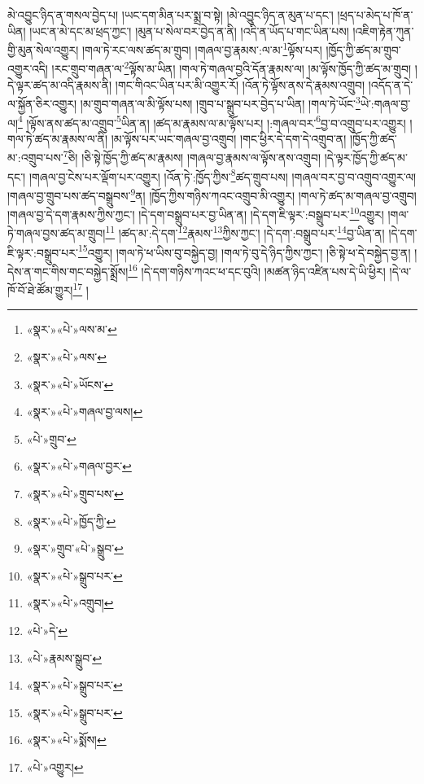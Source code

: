 མེ་འབྱུང་ཉིད་ན་གསལ་བྱེད་པ། །ཡང་དག་མིན་པར་སྨྲ་བ་སྟེ། །མེ་འབྱུང་ཉིད་ན་མུན་པ་དང་། །ཕྲད་པ་མེད་པ་ཁོ་ན་ཡིན། །ཡང་ན་མེ་དང་མ་ཕྲད་ཀྱང་། །མུན་པ་སེལ་བར་བྱེད་ན་ནི། །འདི་ན་ཡོད་པ་གང་ཡིན་པས། །འཇིག་རྟེན་ཀུན་གྱི་མུན་སེལ་འགྱུར། །གལ་ཏེ་རང་ལས་ཚད་མ་གྲུབ། །གཞལ་བྱ་རྣམས་:ལ་མ་\footnote{«སྣར་»«པེ་»ལས་མ་}ལྟོས་པར། །ཁྱོད་ཀྱི་ཚད་མ་གྲུབ་འགྱུར་འདི། །རང་གྲུབ་གཞན་ལ་\footnote{«སྣར་»«པེ་»ལས་}ལྟོས་མ་ཡིན། །གལ་ཏེ་གཞལ་བྱའི་དོན་རྣམས་ལ། །མ་ལྟོས་ཁྱོད་ཀྱི་ཚད་མ་གྲུབ། །དེ་ལྟར་ཚད་མ་འདི་རྣམས་ནི། །གང་གིའང་ཡིན་པར་མི་འགྱུར་རོ། །འོན་ཏེ་ལྟོས་ནས་དེ་རྣམས་འགྲུབ། །འདོད་ན་དེ་ལ་སྐྱོན་ཅིར་འགྱུར། །མ་གྲུབ་གཞན་ལ་མི་ལྟོས་པས། །གྲུབ་པ་སྒྲུབ་པར་བྱེད་པ་ཡིན། །གལ་ཏེ་ཡོང་\footnote{«སྣར་»«པེ་»ཡོངས་}ཡེ་:གཞལ་བྱ་ལ།\footnote{«སྣར་»«པེ་»གཞལ་བྱ་ལས།} །ལྟོས་ནས་ཚད་མ་འགྲུབ་\footnote{«པེ་»གྲུབ་}ཡིན་ན། །ཚད་མ་རྣམས་ལ་མ་ལྟོས་པར། །:གཞལ་བར་\footnote{«སྣར་»«པེ་»གཞལ་བྱར་}བྱ་བ་འགྲུབ་པར་འགྱུར། །གལ་ཏེ་ཚད་མ་རྣམས་ལ་ནི། །མ་ལྟོས་པར་ཡང་གཞལ་བྱ་འགྲུབ། །གང་ཕྱིར་དེ་དག་དེ་འགྲུབ་ན། །ཁྱོད་ཀྱི་ཚད་མ་:འགྲུབ་པས་\footnote{«སྣར་»«པེ་»གྲུབ་པས་}ཅི། །ཅི་སྟེ་ཁྱོད་ཀྱི་ཚད་མ་རྣམས། །གཞལ་བྱ་རྣམས་ལ་ལྟོས་ནས་འགྲུབ། །དེ་ལྟར་ཁྱོད་ཀྱི་ཚད་མ་དང་། །གཞལ་བྱ་ངེས་པར་ལྡོག་པར་འགྱུར། །འོན་ཏེ་:ཁྱོད་ཀྱིས་\footnote{«སྣར་»«པེ་»ཁྱོད་ཀྱི་}ཚད་གྲུབ་པས། །གཞལ་བར་བྱ་བ་འགྲུབ་འགྱུར་ལ། །གཞལ་བྱ་གྲུབ་པས་ཚད་བསྒྲུབས་\footnote{«སྣར་»གྲུབ་«པེ་»སྒྲུབ་}ན། །ཁྱོད་ཀྱིས་གཉིས་ཀའང་འགྲུབ་མི་འགྱུར། །གལ་ཏེ་ཚད་མ་གཞལ་བྱ་འགྲུབ། །གཞལ་བྱ་དེ་དག་རྣམས་ཀྱིས་ཀྱང་། །དེ་དག་བསྒྲུབ་པར་བྱ་ཡིན་ན། །དེ་དག་ཇི་ལྟར་:བསྒྲུབ་པར་\footnote{«སྣར་»«པེ་»སྒྲུབ་པར་}འགྱུར། །གལ་ཏེ་གཞལ་བྱས་ཚད་མ་གྲུབ།\footnote{«སྣར་»«པེ་»འགྲུབ།} །ཚད་མ་:དེ་དག་\footnote{«པེ་»དེ་}རྣམས་\footnote{«པེ་»རྣམས་སྒྲུབ་}ཀྱིས་ཀྱང་། །དེ་དག་:བསྒྲུབ་པར་\footnote{«སྣར་»«པེ་»སྒྲུབ་པར་}བྱ་ཡིན་ན། །དེ་དག་ཇི་ལྟར་:བསྒྲུབ་པར་\footnote{«སྣར་»«པེ་»སྒྲུབ་པར་}འགྱུར། །གལ་ཏེ་ཕ་ཡིས་བུ་བསྐྱེད་བྱ། །གལ་ཏེ་བུ་དེ་ཉིད་ཀྱིས་ཀྱང་། །ཅི་སྟེ་ཕ་དེ་བསྐྱེད་བྱ་ན། །དེས་ན་གང་གིས་གང་བསྐྱེད་སྨྲོས།\footnote{«སྣར་»«པེ་»སྨོས།} །དེ་དག་གཉིས་ཀའང་ཕ་དང་བུའི། །མཚན་ཉིད་འཛིན་པས་དེ་ཡི་ཕྱིར། །དེ་ལ་ཁོ་བོ་ཐེ་ཚོམ་གྱུར།\footnote{«པེ་»འགྱུར།} །
